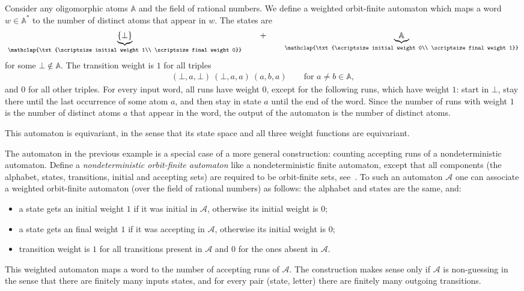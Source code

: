 \documentclass[10pt,a4paper]{amsart}
\numberwithin{equation}{section}
\newcommand{\set}[1]{\{#1\}}
\newcommand{\Aa}{{\mathcal A}}
\newcommand{\myunderbrace}[2]{\underbrace{#1}_{\mathclap{\txt{\scriptsize #2}}}}
\newcommand{\atoms}{\mathbb A}
\begin{document}
\begin{example}\label{ex:count-letters} Consider any oligomorphic atoms $\atoms$ and the field of rational numbers. We define a weighted orbit-finite automaton  which maps a word $w \in \atoms^*$ to the number of distinct atoms that appear in $w$. The states are
    \newcommand*{\theinitialstate}{\bot}
    \begin{align*}
      \myunderbrace{\set{ \theinitialstate }}{initial weight 1\\
    \scriptsize final weight 0} \qquad  + \qquad   \myunderbrace{\atoms}{initial weight 0\\
    \scriptsize final weight 1}
    \end{align*}
     for some $\bot\not\in\atoms$. The transition weight is $1$ for all triples
    \begin{align*}
    (\theinitialstate, a, \theinitialstate) \  (\theinitialstate, a, a) \ (a, b, a) \qquad \text{for } a \neq b \in \atoms,
    \end{align*}
    and $0$ for all other triples. 
    For every input word, all runs have weight $0$, except for the following runs, which have weight $1$: start in $\theinitialstate$, stay there until  the last occurrence of some atom $a$, and then stay in state $a$ until the end of the word. Since the number of runs with weight $1$ is the number of distinct atoms $a$ that appear in the word, the output of the automaton is the number of distinct atoms. 
    
This automaton is equivariant, in the sense that its state space and all three weight functions are equivariant.      
\end{example}

\begin{example} \label{ex:count-runs} The automaton in the previous example is a special case of a more general construction: counting accepting runs of a nondeterministic automaton. 
    Define a \emph{nondeterministic orbit-finite automaton} like a nondeterministic finite automaton, except that all components (the alphabet, states, transitions, initial and accepting sets) are required to be orbit-finite sets, see~\cite[Def.~5.7]{bojanczyk_slightly2018}. To such an automaton $\Aa$ one can associate a weighted orbit-finite automaton (over the field of rational numbers) as follows: the alphabet and states are the same, and:
\begin{itemize}
\item a state gets an initial weight $1$ if it was initial in $\Aa$, otherwise its initial weight is $0$;
\item a state gets an final weight $1$ if it was accepting in $\Aa$, otherwise its initial weight is $0$;
\item transition weight is $1$ for all transitions present in $\Aa$ and $0$ for the ones absent in $\Aa$.
\end{itemize}
This  weighted automaton maps a word to the number of accepting runs of $\Aa$. The construction makes sense only if $\Aa$ is non-guessing in the sense that there are finitely many inputs states, and for every pair (state, letter) there are finitely many outgoing transitions. 
\end{example}
\end{document}

